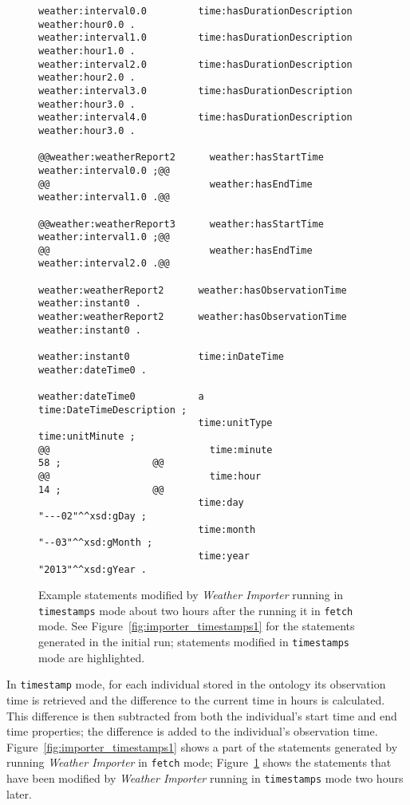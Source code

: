 \begin{figure}
\begin{lstlisting}[escapechar=!]
weather:interval0.0         time:hasDurationDescription           weather:hour0.0 .
weather:interval1.0         time:hasDurationDescription           weather:hour1.0 .
weather:interval2.0         time:hasDurationDescription           weather:hour2.0 .
weather:interval3.0         time:hasDurationDescription           weather:hour3.0 .
weather:interval4.0         time:hasDurationDescription           weather:hour3.0 .

@@weather:weatherReport2      weather:hasStartTime                  weather:interval0.0 ;@@
@@                            weather:hasEndTime                    weather:interval1.0 .@@

@@weather:weatherReport3      weather:hasStartTime                  weather:interval1.0 ;@@
@@                            weather:hasEndTime                    weather:interval2.0 .@@

weather:weatherReport2      weather:hasObservationTime            weather:instant0 .
weather:weatherReport2      weather:hasObservationTime            weather:instant0 .

weather:instant0            time:inDateTime                       weather:dateTime0 .

weather:dateTime0           a                                     time:DateTimeDescription ;
                            time:unitType                         time:unitMinute ;
@@                            time:minute                           58 ;                @@
@@                            time:hour                             14 ;                @@
                            time:day                              "---02"^^xsd:gDay ;
                            time:month                            "--03"^^xsd:gMonth ;
                            time:year                             "2013"^^xsd:gYear .
\end{lstlisting}
\caption{Example statements modified by \emph{Weather Importer} running in \texttt{timestamps} mode about two hours after the running it in \texttt{fetch} mode. See Figure~\ref{fig:importer_timestamps1} for the statements generated in the initial run; statements modified in \texttt{timestamps} mode are highlighted.}
\label{fig:importer_timestamps2}
\end{figure}

In \texttt{timestamp} mode, for each  individual stored in the ontology its observation time is retrieved and the difference to the current time in hours is calculated. This difference is then subtracted from both the individual's start time and end time properties; the difference is added to the individual's observation time. Figure~\ref{fig:importer_timestamps1} shows a part of the statements generated by running \emph{Weather Importer} in \texttt{fetch} mode; Figure~\ref{fig:importer_timestamps2} shows the statements that have been modified by \emph{Weather Importer} running in \texttt{timestamps} mode two hours later.


